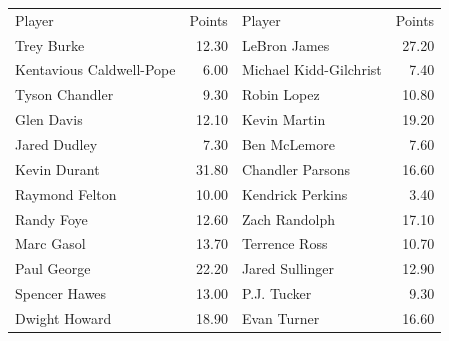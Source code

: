 \documentclass[letterpaper]{exam}
\begin{document}
\begin{questions}
      \begin{table}[ht]
        \centering
        \begin{tabular}{lr|lr}
          \toprule
          \midrule
          Player                   & Points & Player                 & Points\\
          Trey Burke               & 12.30  & LeBron James           & 27.20 \\
          Kentavious Caldwell-Pope & 6.00   & Michael Kidd-Gilchrist & 7.40 \\
          Tyson Chandler           & 9.30   & Robin Lopez            & 10.80 \\
          Glen Davis               & 12.10  & Kevin Martin           & 19.20 \\
          Jared Dudley             & 7.30   & Ben McLemore           & 7.60 \\
          Kevin Durant             & 31.80  & Chandler Parsons       & 16.60 \\
          Raymond Felton           & 10.00  & Kendrick Perkins       & 3.40 \\
          Randy Foye               & 12.60  & Zach Randolph          & 17.10 \\
          Marc Gasol               & 13.70  & Terrence Ross          & 10.70 \\
          Paul George              & 22.20  & Jared Sullinger        & 12.90 \\
          Spencer Hawes            & 13.00  & P.J. Tucker            & 9.30 \\
          Dwight Howard            & 18.90  & Evan Turner            & 16.60 \\
          \bottomrule
        \end{tabular}
      \end{table}

      \begin{parts}

\end{parts}
\end{questions}
\end{document}
